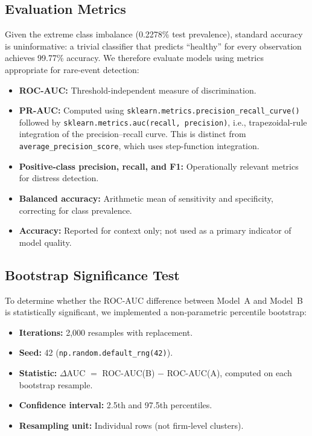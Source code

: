 \documentclass[sigconf,anonymous]{acmart}
\begin{document}
\subsection{Evaluation Metrics}
Given the extreme class imbalance (0.2278\% test prevalence), standard accuracy is uninformative: a trivial classifier that predicts ``healthy'' for every observation achieves 99.77\% accuracy. We therefore evaluate models using metrics appropriate for rare-event detection:
\begin{itemize}
    \item \textbf{ROC-AUC:} Threshold-independent measure of discrimination.
    \item \textbf{PR-AUC:} Computed using \texttt{sklearn.metrics.precision\_recall\_curve()} followed by \texttt{sklearn.metrics.auc(recall, precision)}, i.e., trapezoidal-rule integration of the precision--recall curve. This is distinct from \texttt{average\_precision\_score}, which uses step-function integration.
    \item \textbf{Positive-class precision, recall, and F1:} Operationally relevant metrics for distress detection.
    \item \textbf{Balanced accuracy:} Arithmetic mean of sensitivity and specificity, correcting for class prevalence.
    \item \textbf{Accuracy:} Reported for context only; not used as a primary indicator of model quality.
\end{itemize}

\subsection{Bootstrap Significance Test}
To determine whether the ROC-AUC difference between Model~A and Model~B is statistically significant, we implemented a non-parametric percentile bootstrap:
\begin{itemize}
    \item \textbf{Iterations:} 2,000 resamples with replacement.
    \item \textbf{Seed:} 42 (\texttt{np.random.default\_rng(42)}).
    \item \textbf{Statistic:} $\Delta$AUC $=$ ROC-AUC(B) $-$ ROC-AUC(A), computed on each bootstrap resample.
    \item \textbf{Confidence interval:} 2.5th and 97.5th percentiles.
    \item \textbf{Resampling unit:} Individual rows (not firm-level clusters).
\end{itemize}
\end{document}
